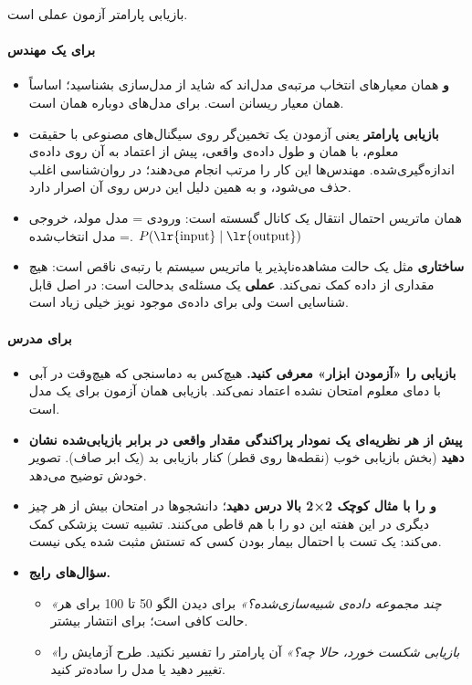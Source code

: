 بازیابی پارامتر آزمون عملی  است.

\paragraph{برای یک مهندس}

\begin{itemize}
\tightlist
\item
  \textbf{ و } همان معیارهای انتخاب مرتبه‌ی مدل‌اند که
  شاید از مدل‌سازی  بشناسید؛ \textbf{} اساساً همان
  معیار \textbf{} ریسانن است.  برای مدل‌های 
  دوباره همان  است.
\item
  \textbf{بازیابی پارامتر} یعنی آزمودن یک تخمین‌گر روی سیگنال‌های مصنوعی
  با حقیقت معلوم، با همان  و طول داده‌ی واقعی، پیش از اعتماد به
  آن روی داده‌ی اندازه‌گیری‌شده. مهندس‌ها این کار را مرتب انجام می‌دهند؛ در
  روان‌شناسی اغلب حذف می‌شود، و به همین دلیل این درس روی آن اصرار دارد.
\item
  \textbf{} همان ماتریس احتمال انتقال یک کانال
  گسسته است: ورودی = مدل مولد، خروجی = مدل انتخاب‌شده.
  \(P(\text{\lr{input}} \mid \text{\lr{output}})\)
\item
  \textbf{ ساختاری} مثل یک حالت مشاهده‌ناپذیر یا
  ماتریس سیستم با رتبه‌ی ناقص است: هیچ مقداری از داده کمک نمی‌کند.
  \textbf{ عملی} یک مسئله‌ی بدحالت است: در اصل
  قابل شناسایی است ولی برای داده‌ی موجود نویز خیلی زیاد است.
\end{itemize}

\paragraph{برای مدرس}

\begin{itemize}
\tightlist
\item
  \textbf{بازیابی را «آزمودن ابزار» معرفی کنید.} هیچ‌کس به دماسنجی که
  هیچ‌وقت در آبی با دمای معلوم امتحان نشده اعتماد نمی‌کند. بازیابی همان
  آزمون برای یک مدل است.
\item
  \textbf{پیش از هر نظریه‌ای یک نمودار پراکندگی مقدار واقعی در برابر
  بازیابی‌شده نشان دهید} (بخش  بازیابی خوب (نقطه‌ها روی قطر)
  کنار بازیابی بد (یک ابر صاف). تصویر خودش توضیح می‌دهد.
\item
  \textbf{ و  را با مثال کوچک 2×2 بالا درس
  دهید}؛ دانشجوها در امتحان بیش از هر چیز دیگری در این هفته این دو را با
  هم قاطی می‌کنند. تشبیه تست پزشکی کمک می‌کند:  یک تست با
  احتمال بیمار بودن کسی که تستش مثبت شده یکی نیست.
\item
  \textbf{سؤال‌های رایج.}

  \begin{itemize}
  \tightlist
  \item
    \emph{«چند مجموعه داده‌ی شبیه‌سازی‌شده؟»} برای دیدن الگو 50 تا 100 برای
    هر حالت کافی است؛ برای انتشار بیشتر.
  \item
    \emph{«بازیابی شکست خورد، حالا چه؟»} آن پارامتر را تفسیر نکنید. طرح
    آزمایش را تغییر دهید یا مدل را ساده‌تر کنید.
  \end{itemize}
\end{itemize}

